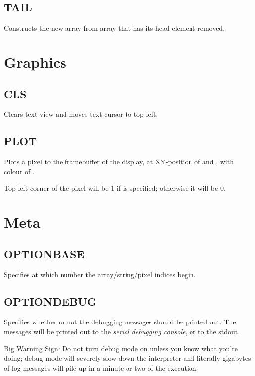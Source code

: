     \subsection{TAIL}
        \par
        Constructs the new array from array  that has its head element removed.
        
\section{Graphics}

    \subsection{CLS}
        \par
        Clears text view and moves text cursor to top-left.
    \subsection{PLOT}
        \par
        Plots a pixel to the framebuffer of the display, at XY-position of  and , with colour of .\par
        Top-left corner of the pixel will be 1 if  is specified; otherwise it will be 0.

\section{Meta}

    \subsection{OPTIONBASE}
        \par
        Specifies at which number the array/string/pixel indices begin.
    \subsection{OPTIONDEBUG}
        \par
        Specifies whether or not the debugging messages should be printed out. The messages will be printed out to the \emph{serial debugging console}, or to the stdout.\par
        {\LARGE Big Warning Sign:} Do not turn debug mode on unless you know what you're doing; debug mode will severely slow down the interpreter and literally gigabytes of log messages will pile up in a minute or two of the execution.
